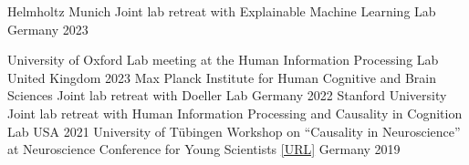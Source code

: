 \begin{cvhonors}
    \cvhonor
    {Helmholtz Munich} %
    {Joint lab retreat with Explainable Machine Learning Lab} 
    {Germany} %
    {2023} %
    
    \cvhonor
    {University of Oxford} %
    {Lab meeting at the Human Information Processing Lab} %
    {United Kingdom} %
    {2023} %
    \cvhonor
    {Max Planck Institute for Human Cognitive and Brain Sciences} %
    {Joint lab retreat with Doeller Lab} %
    {Germany} %
    {2022} %
    \cvhonor
    {Stanford University} %
    {Joint lab retreat with Human Information Processing and Causality in Cognition Lab} %
    {USA} %
    {2021} %
    \cvhonor
    {University of Tübingen} %
    {Workshop on ``Causality in Neuroscience'' at Neuroscience Conference for Young Scientists \href{https://nenaconference.wordpress.com/wp-content/uploads/2019/10/schedule_nena2019.pdf}{[URL]}} %
    {Germany} %
    {2019} %
    \vspace{3mm}
\end{cvhonors}


